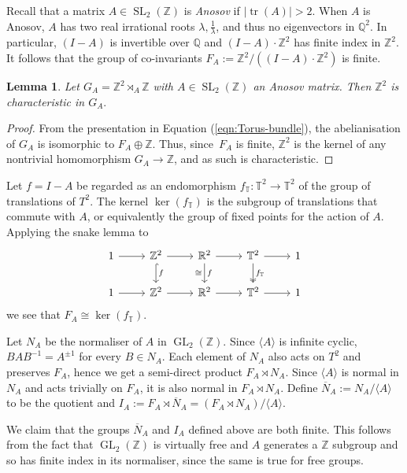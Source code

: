 \documentclass{amsart}
\theoremstyle{plain}
\newtheorem{lem}[thm]{Lemma}
\theoremstyle{definition}
\DeclareMathOperator\SL{SL}
\DeclareMathOperator\GL{GL}
\DeclareMathOperator{\tr}{tr}
\newcommand{\bbZ}{\mathbb{Z}}
\newcommand{\bbQ}{\mathbb{Q}}
\newcommand{\bbR}{\mathbb{R}}
\newcommand{\bbT}{\mathbb{T}}
\newcommand{\Z}{\mathbb{Z}}
\begin{document}
Recall that a matrix $A\in \SL_2(\Z)$ is \emph{Anosov} if $|\tr(A)|>2$.
When $A$ is Anosov, $A$ has two real irrational roots $\lambda, \frac{1}{\lambda}$, and thus no eigenvectors in $\bbQ^2$. In particular, $(I-A)$ is invertible over $\bbQ$ and $(I-A)\cdot \Z^2$ has finite index in $\Z^2$. It follows that the group of co-invariants $F_A:=\Z^2/((I-A)\cdot \Z^2)$ is finite.

\begin{lem}\label{lem:Characteristic-Abelian}Let $G_A=\Z^2\rtimes_A \Z$ with $A\in \SL_2(\Z)$ an Anosov matrix. Then $\Z^2$ is characteristic in $G_A.$  
\end{lem}
\begin{proof}
    From the presentation in Equation (\ref{eqn:Torus-bundle}), the abelianisation of $G_A$ is isomorphic to $F_A\oplus \Z$. Thus, since~$F_A$ is finite, $\Z^2$ is the kernel of any nontrivial homomorphism $G_A\rightarrow \Z$, and as such is characteristic.
\end{proof}

Let $f=I-A$ be regarded as an endomorphism $f_{\bbT}\colon \bbT^2 \to \bbT^2$ of the group of translations of $T^2$.  The kernel $\ker(f_\bbT)$ is the subgroup of translations that commute with $A$, or equivalently the group of fixed points for the action of $A$.
Applying the snake lemma to
\[\begin{tikzcd}
	1 & {\bbZ^2} & {\bbR^2} & {\mathbb{T}^2} & 1 \\
	1 & {\bbZ^2} & {\bbR^2} & {\mathbb{T}^2} & 1 
	\arrow["f", hook, from=1-2, to=2-2]
	\arrow["f", "\cong"', from=1-3, to=2-3]
	\arrow["f_\bbT", two heads, from=1-4, to=2-4]
	\arrow[from=2-1, to=2-2]
	\arrow[from=2-2, to=2-3]
	\arrow[from=2-3, to=2-4]
	\arrow[from=2-4, to=2-5]
	\arrow[from=1-1, to=1-2]
	\arrow[from=1-2, to=1-3]
	\arrow[from=1-3, to=1-4]
	\arrow[from=1-4, to=1-5]
\end{tikzcd}\]
we see that $F_A \cong \ker(f_\bbT)$.


Let $N_A$ be the normaliser of $A$ in $\GL_2(\Z)$. Since $\langle A\rangle$ is infinite cyclic, $BAB^{-1}=A^{\pm 1}$ for every $B\in N_A$. Each element of $N_A$ also acts on $T^2$ and preserves $F_A$, hence we get a semi-direct product $F_A\rtimes N_A.$ Since $\langle A\rangle$ is normal in $N_A$ and acts trivially on $F_A$, it is also normal in $F_A\rtimes N_A$.  Define $\overline{N}_A:=N_A/\langle A\rangle$ to be the quotient and $I_A:=F_A\rtimes \overline{N}_A=(F_A\rtimes N_A)/\langle A\rangle$.


We claim that the groups $\overline{N}_A$ and $I_A$ defined above are both finite. This follows from the fact that $\GL_2(\Z)$ is virtually free and $A$ generates a $\Z$ subgroup and so has finite index in its normaliser, since the same is true for free groups.
\end{document}
